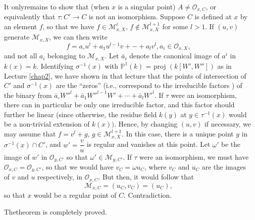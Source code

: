 It only\pageoriginale remains to show that (when $x$ is a singular
point) $A \neq 
\mathscr{O}_{x,C}$, or equivalently that $\tau : C' \to C$ is not an
isomorphism. Suppose $C$ is defined at $x$ by an element $f$, so that
we have $ f \in \mathcal{M}^l_{x,X}$, $f \notin \mathcal{M}^{l+1}_{x,X}$
for some $l>1$. If $(u,v)$ generate  $\mathcal{M}_{x,X}$, we can then
write  
$$
f=a_\circ u^l + a_1 u^{l-1} v + - + a_l v^l, a_i \in \mathscr{O}_{x,X},  
$$
and not all $a_i$ belonging to $\mathcal{M}_{x,X}$. Let $\bar{a}_i$
denote the canonical image of $a^i$ in $k(x)=k$. Identifying $
\sigma^{-1}(x)$ with $\mathbb{P}^1(k)$ = proj $(k[W', W''])$ as in
Lecture \ref{chap2}, we have shown in that  lecture that the points of
intersection of $C'$ and $ \sigma^{-1}(x)$ are the ``zeros'' (i.e.,
correspond to the irreducible factors ) of the binary from
$\bar{a}_\circ     
W''^l + \bar{a}_1 W''^{l-1} W' + \cdots + \bar a_l W'^l$. If $\tau $
were an isomorphism, there can in particular be only one irreducible
factor, and this factor should further be linear (since otherwise, the
residue field $k(y)$ at $y \in \tau^{-1}(x)$ would be a non-trivial
extension of $k(x))$. Hence, by changing $(u,v)$ if necessary, we may
assume that  
$f = v^l + g$, $g \in \mathcal{M}^{l+1}_{x,X}$. In this case, there is a
unique point $y$ in $\sigma^{-1}(x)\cap C'$, and $w' = \dfrac{v}{u}$
is regular and vanishes at this point. Let $\omega'$ be the image of
$w'$ in $\mathscr{O}_{y,C'}$ so that $\omega' \in
\mathcal{M}_{y,C'}$. If $\tau$ were an isomorphism, we must have
$\mathscr{O}_{x,C} = \mathscr{O}_{y,C'}$, so that we would have $v_C =
\omega u_C$, where $v_C$ and $u_C$ are the images of $v$ and $u$
respectively, in $\mathscr{O}_{x,C}$. But then, it would follow that 
$$
\mathcal{M}_{x,C} = (u_C, v_C) = (u_C),
$$
so that $x$ would be a regular point of $C$. Contradiction.

The\pageoriginale theorem is completely proved.

